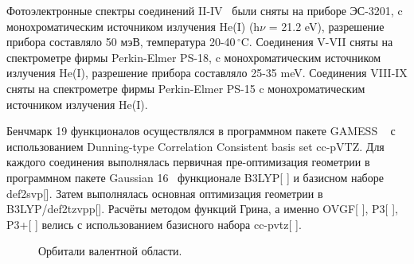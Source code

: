 \documentclass[a4paper,fleqn]{cas-dc}
\begin{document}
\par Фотоэлектронные спектры соединений II-IV~\cite{Vovna_Grinc} были сняты на приборе ЭС-3201, c монохроматическим источником излучения He(I) (h$\nu$ = 21.2 eV), разрешение прибора составляло 50 мэВ, температура 20-40\,$^\circ$C.
Соединения V-VII сняты на спектрометре фирмы Perkin-Elmer PS-18, c монохроматическим источником излучения He(I), разрешение прибора составляло 25-35 meV.
Соединения VIII-IX сняты на спектрометре фирмы Perkin-Elmer PS-15 c монохроматическим источником излучения He(I).

\par Бенчмарк 19 функционалов осуществлялся в программном пакете GAMESS ~\cite{GAMESS} с использованием Dunning-type Correlation Consistent basis set cc-pVTZ. Для каждого соединения
выполнялась первичная пре-оптимизация геометрии в программном пакете Gaussian 16~\cite{g16} функционале B3LYP[ ] и базисном наборе def2svp[]. Затем выполнялась
основная оптимизация геометрии в B3LYP/def2tzvpp[]. Расчёты методом функций Грина, а именно OVGF[ ], P3[ ], P3+[ ] велись с использованием базисного набора cc-pvtz[ ].

\lipsum[3]


\begin{figure}[ht]
    \caption{Орбитали валентной области.}
    \label{Ris_4_orbitali_malanat}
    \end{figure}

\lipsum[7-8]
\end{document}
